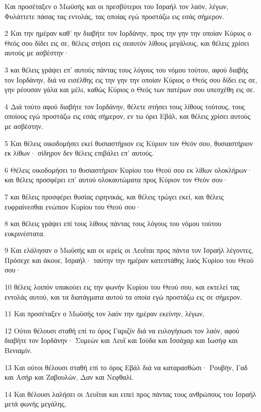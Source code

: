 \par Και προσέταξεν ο Μωϋσής και οι πρεσβύτεροι του Ισραήλ τον λαόν, λέγων, Φυλάττετε πάσας τας εντολάς, τας οποίας εγώ προστάζω εις εσάς σήμερον.
\par 2 Και την ημέραν καθ' ην διαβήτε τον Ιορδάνην, προς την γην την οποίαν Κύριος ο Θεός σου δίδει εις σε, θέλεις στήσει εις σεαυτόν λίθους μεγάλους, και θέλεις χρίσει αυτούς με ασβέστην·
\par 3 και θέλεις γράψει επ' αυτούς πάντας τους λόγους του νόμου τούτου, αφού διαβής τον Ιορδάνην, διά να εισέλθης εις την γην την οποίαν Κύριος ο Θεός σου δίδει εις σε, γην ρέουσαν γάλα και μέλι, καθώς Κύριος ο Θεός των πατέρων σου υπεσχέθη εις σε.
\par 4 Διά τούτο αφού διαβήτε τον Ιορδάνην, θέλετε στήσει τους λίθους τούτους, τους οποίους εγώ προστάζω εις εσάς σήμερον, εν τω όρει Εβάλ, και θέλεις χρίσει αυτούς με ασβέστην.
\par 5 Και θέλεις οικοδομήσει εκεί θυσιαστήριον εις Κύριον τον Θεόν σου, θυσιαστήριον εκ λίθων· σίδηρον δεν θέλεις επιβάλει επ' αυτούς.
\par 6 Θέλεις οικοδομήσει το θυσιαστήριον Κυρίου του Θεού σου εκ λίθων ολοκλήρων· και θέλεις προσφέρει επ' αυτού ολοκαυτώματα προς Κύριον τον Θεόν σου·
\par 7 και θέλεις προσφέρει θυσίας ειρηνικάς, και θέλεις τρώγει εκεί, και θέλεις ευφραίνεσθαι ενώπιον Κυρίου του Θεού σου·
\par 8 και θέλεις γράψει επί τους λίθους πάντας τους λόγους του νόμου τούτου ευκρινέστατα.
\par 9 Και ελάλησαν ο Μωϋσής και οι ιερείς οι Λευΐται προς πάντα τον Ισραήλ λέγοντες, Πρόσεχε και άκουε, Ισραήλ· ταύτην την ημέραν κατεστάθης λαός Κυρίου του Θεού σου·
\par 10 θέλεις λοιπόν υπακούει εις την φωνήν Κυρίου του Θεού σου, και εκτελεί τας εντολάς αυτού, και τα διατάγματα αυτού τα οποία εγώ προστάζω εις σε σήμερον.
\par 11 Και προσέταξεν ο Μωϋσής τον λαόν την ημέραν εκείνην, λέγων,
\par 12 Ούτοι θέλουσι σταθή επί το όρος Γαριζίν διά να ευλογήσωσι τον λαόν, αφού διαβήτε τον Ιορδάνην· Συμεών και Λευΐ και Ιούδα και Ισσάχαρ και Ιωσήφ και Βενιαμίν.
\par 13 Και ούτοι θέλουσι σταθή επί το όρος Εβάλ διά να καταρασθώσι· Ρουβήν, Γαδ και Ασήρ και Ζαβουλών, Δαν και Νεφθαλί.
\par 14 Και θέλουσι λαλήσει οι Λευΐται και ειπεί προς πάντας τους ανθρώπους του Ισραήλ μετά φωνής μεγάλης,
